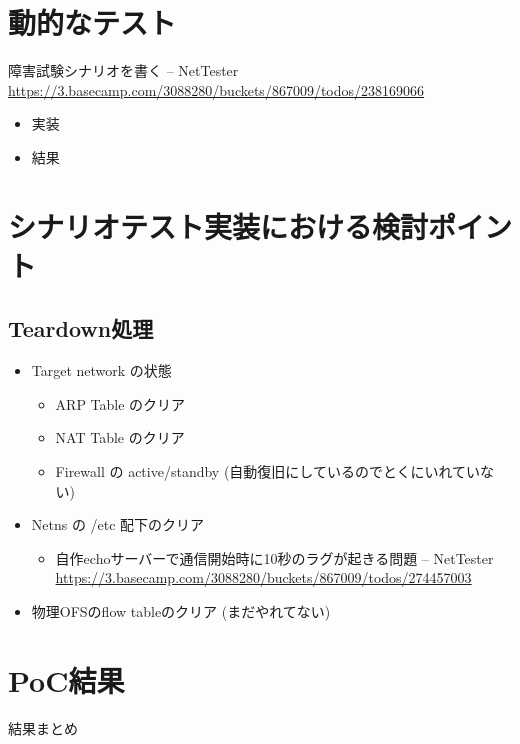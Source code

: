 \section{動的なテスト}

障害試験シナリオを書く – NetTester \url{https://3.basecamp.com/3088280/buckets/867009/todos/238169066}

\begin{itemize}
 \item 実装
 \item 結果
\end{itemize}

\section{シナリオテスト実装における検討ポイント}

\subsection{Teardown処理}

\begin{itemize}
 \item Target network の状態
       \begin{itemize}
        \item ARP Table のクリア
        \item NAT Table のクリア
        \item Firewall の active/standby (自動復旧にしているのでとくにいれていない)
       \end{itemize}
 \item Netns の /etc 配下のクリア
       \begin{itemize}
        \item 自作echoサーバーで通信開始時に10秒のラグが起きる問題 – NetTester \url{https://3.basecamp.com/3088280/buckets/867009/todos/274457003}
       \end{itemize}
 \item 物理OFSのflow tableのクリア (まだやれてない)
\end{itemize}

\section{PoC結果}

結果まとめ

